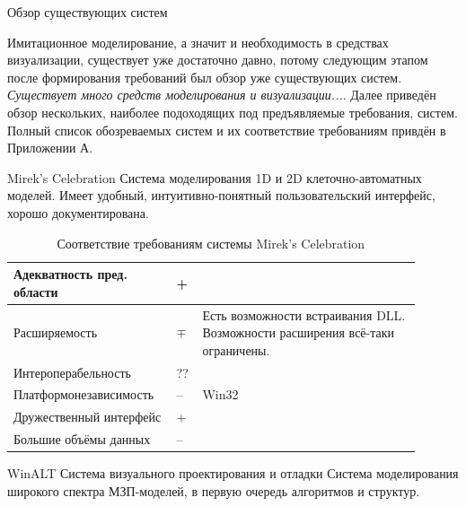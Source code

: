 \documentclass[a4paper,12pt]{extarticle}
\begin{document}
\begin{section}{Обзор существующих систем}

Имитационное моделирование, а значит и необходимость в средствах визуализации, существует уже достаточно давно, потому следующим этапом после формирования требований был обзор уже существующих систем.
\textit{Существует много средств моделирования и визуализации...}.
Далее приведён обзор нескольких, наиболее подоходящих под предъявляемые требования, систем. Полный список обозреваемых систем и их соответствие требованиям привдён в Приложении А. 

\begin{subsection}{Mirek's Celebration}
    Система моделирования 1D и 2D клеточно-автоматных моделей.
    Имеет удобный, интуитивно-понятный пользовательский интерфейс, хорошо документирована.

    \begin{table}[h]
        \caption{Соответствие требованиям системы Mirek's Celebration}
        \label{tabular:mirekscell}
        \begin{center}
            \begin{tabular}{|p{0.35\linewidth}|p{0.05\linewidth}|p{0.5\linewidth}|} \hline
                Адекватность пред. области & + & \\ \hline
                Расширяемость              & $\mp$ & Есть возможности встраивания DLL. Возможности расширения всё-таки ограничены. \\ \hline
                Интероперабельность        & ?? & \\ \hline
                Платформонезависимость     & -- & Win32 \\ \hline
                Дружественный интерфейс    & + & \\ \hline
                Большие объёмы данных      & -- & \\ \hline
            \end{tabular}
        \end{center}
    \end{table}
\end{subsection}

\begin{subsection}{WinALT}
Система визуального проектирования и отладки
    Система моделирования широкого спектра МЗП-моделей, в первую очередь алгоритмов и структур.


\end{subsection}
\end{section}
\end{document}
